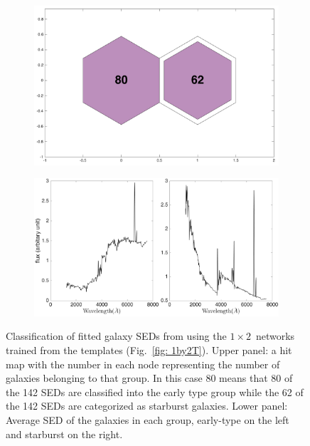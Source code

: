             \begin{figure}
                \begin{subfigure}[b]{0.5\textwidth}
                    \centering
                    \includegraphics[width=\textwidth]{../image_paper2/1d/hit_v_1_by_2.png}
                \end{subfigure}
                \hfill
                \begin{subfigure}[b]{0.5\textwidth}
                     \includegraphics[width=\textwidth]{../image_paper2/1d/SED_total1by2.png}
                \end{subfigure}
                \caption{Classification of fitted galaxy SEDs from  using the $1\times2$~networks trained from the  templates (Fig.~\ref{fig: 1by2T}). Upper panel: a hit map with the number in each node representing the number of galaxies belonging to that group. In this case 80 means that 80 of the 142 SEDs are classified into the early type group while the 62 of the 142 SEDs are categorized as starburst galaxies. Lower panel: Average SED of the galaxies in each group, early-type on the left and starburst on the right.}
                \label{fig: 1by2V}
            \end{figure}          
            
